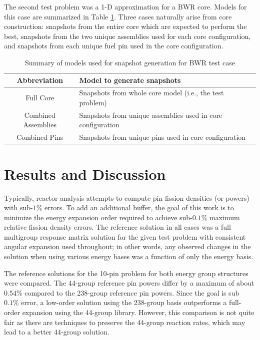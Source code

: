 \documentclass[5p,times,twocolumn,10pt]{elsarticle}
\begin{document}
    The second test problem was a 1-D approximation for a BWR core.  Models for
    this case are summarized in Table \ref{tab:bwrsnapshots}.  Three cases
    naturally arise from core construction: snapshots from the entire core
which
    are expected to perform the best, snapshots from the two unique assemblies
    used for each core configuration, and snapshots from each unique fuel pin
    used in the core configuration.

    \begin{table}[htb]
        \centering
        \caption{Summary of models used for snapshot generation for BWR test
            case}
        \begin{tabular}{c | l}\toprule
            Abbreviation         & Model to generate snapshots \\ \midrule
            Full Core            & Snapshots from whole core model (i.e., the
            test problem) \\
            Combined Assemblies  & Snapshots from unique assemblies used in
core
            configuration \\
            Combined Pins        & Snapshots from unique pins used in core
            configuration \\
            \bottomrule
        \end{tabular}
        \label{tab:bwrsnapshots}
    \end{table}

    \section{Results and Discussion}
    \label{sec:results}

    Typically, reactor analysis attempts to compute pin fission densities (or
    powers) with sub-$1\%$ errors.  To add an additional buffer, the goal of
    this work is to minimize the energy expansion order required to achieve
    sub-$0.1\%$ maximum relative fission density errors. The reference solution
    in all cases was a full multigroup response matrix solution for the given
    test problem with consistent angular expansion used throughout; in other
    words, any observed changes in the solution when using various energy bases
    was a function of only the energy basis.

    The reference solutions for the 10-pin problem for both energy group
    structures
    were compared.  The 44-group reference pin powers differ by a maximum
    of about $0.54\%$ compared to the 238-group reference pin powers.
    Since the goal is sub $0.1\%$ error, a low-order solution using the
    238-group basis outperforms a full-order expansion using the 44-group
    library.  However, this comparison is not quite fair as there are techniques
    to preserve the 44-group reaction rates, which may lead to a better
    44-group solution.
\end{document}
